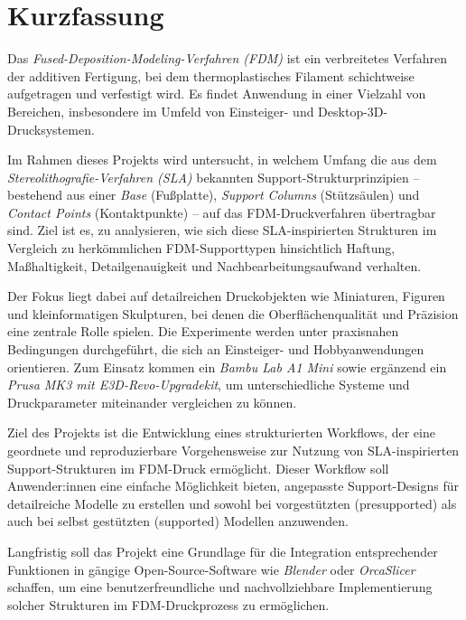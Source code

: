 \chapter*{Kurzfassung}

Das \textit{Fused-Deposition-Modeling-Verfahren (FDM)} ist ein verbreitetes Verfahren der additiven Fertigung, bei dem thermoplastisches Filament schichtweise aufgetragen und verfestigt wird.  
Es findet Anwendung in einer Vielzahl von Bereichen, insbesondere im Umfeld von Einsteiger- und Desktop-3D-Drucksystemen.

Im Rahmen dieses Projekts wird untersucht, in welchem Umfang die aus dem \textit{Stereolithografie-Verfahren (SLA)} bekannten Support-Strukturprinzipien – bestehend aus einer \textit{Base} (Fußplatte), \textit{Support Columns} (Stützsäulen) und \textit{Contact Points} (Kontaktpunkte) – auf das FDM-Druckverfahren übertragbar sind.  
Ziel ist es, zu analysieren, wie sich diese SLA-inspirierten Strukturen im Vergleich zu herkömmlichen FDM-Supporttypen hinsichtlich Haftung, Maßhaltigkeit, Detailgenauigkeit und Nachbearbeitungsaufwand verhalten.

Der Fokus liegt dabei auf detailreichen Druckobjekten wie Miniaturen, Figuren und kleinformatigen Skulpturen, bei denen die Oberflächenqualität und Präzision eine zentrale Rolle spielen.  
Die Experimente werden unter praxisnahen Bedingungen durchgeführt, die sich an Einsteiger- und Hobbyanwendungen orientieren.  
Zum Einsatz kommen ein \textit{Bambu Lab A1 Mini} sowie ergänzend ein \textit{Prusa MK3 mit E3D-Revo-Upgradekit}, um unterschiedliche Systeme und Druckparameter miteinander vergleichen zu können.

Ziel des Projekts ist die Entwicklung eines strukturierten Workflows, der eine geordnete und reproduzierbare Vorgehensweise zur Nutzung von SLA-inspirierten Support-Strukturen im FDM-Druck ermöglicht.  
Dieser Workflow soll Anwender:innen eine einfache Möglichkeit bieten, angepasste Support-Designs für detailreiche Modelle zu erstellen und sowohl bei vorgestützten (presupported) als auch bei selbst gestützten (supported) Modellen anzuwenden.  

Langfristig soll das Projekt eine Grundlage für die Integration entsprechender Funktionen in gängige Open-Source-Software wie \textit{Blender} oder \textit{OrcaSlicer} schaffen, um eine benutzerfreundliche und nachvollziehbare Implementierung solcher Strukturen im FDM-Druckprozess zu ermöglichen.
